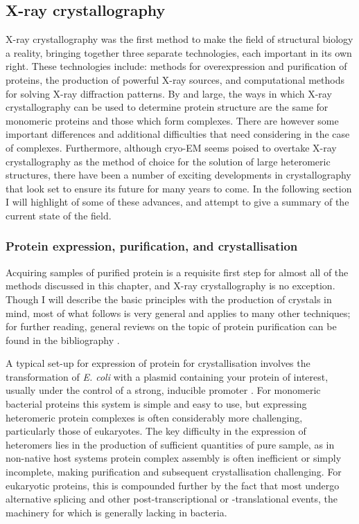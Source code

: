 \documentclass[a4paper,11pt,twoside,openright]{scrbook}
\begin{document}
\subsection{X-ray crystallography}
X-ray crystallography was the first method to make the field of structural biology a reality, bringing together three separate technologies, each important in its own right. These technologies include: methods for overexpression and purification of proteins, the production of powerful X-ray sources, and computational methods for solving X-ray diffraction patterns. By and large, the ways in which X-ray crystallography can be used to determine protein structure are the same for monomeric proteins and those which form complexes. There are however some important differences and additional difficulties that need considering in the case of complexes. Furthermore, although cryo-EM seems poised to overtake X-ray crystallography as the method of choice for the solution of large heteromeric structures, there have been a number of exciting developments in crystallography that look set to ensure its future for many years to come. In the following section I will highlight of some of these advances, and attempt to give a summary of the current state of the field.

\subsubsection{Protein expression, purification, and crystallisation}
Acquiring samples of purified protein is a requisite first step for almost all of the methods discussed in this chapter, and X-ray crystallography is no exception. Though I will describe the basic principles with the production of crystals in mind, most of what follows is very general and applies to many other techniques; for further reading, general reviews on the topic of protein purification can be found in the bibliography \cite{Link2005,Graslund2008,LaCava2016}.

A typical set-up for expression of protein for crystallisation involves the transformation of \textit{E. coli} with a plasmid containing your protein of interest, usually under the control of a strong, inducible promoter \cite{Rosano2014}. For monomeric bacterial proteins this system is simple and easy to use, but expressing heteromeric protein complexes is often considerably more challenging, particularly those of eukaryotes. The key difficulty in the expression of heteromers lies in the production of sufficient quantities of pure sample, as in non-native host systems protein complex assembly is often inefficient or simply incomplete, making purification and subsequent crystallisation challenging. For eukaryotic proteins, this is compounded further by the fact that most undergo alternative splicing and other post-transcriptional or -translational events, the machinery for which is generally lacking in bacteria.
\end{document}
